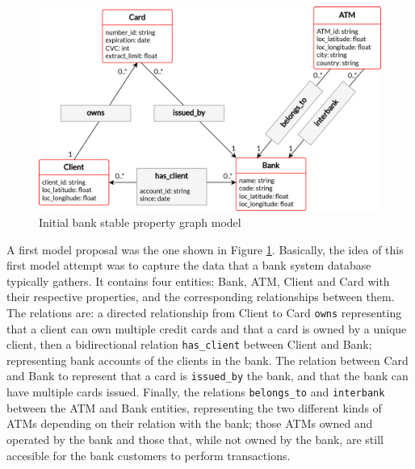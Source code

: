 \documentclass{article}
\begin{document}
\begin{figure}[H]
    \centering
    \includegraphics[scale = 0.7]{images/PG-stable-edit-cardinal.png}
    \caption{Initial bank stable property graph model}
    \label{img:initial-pg-stable}
\end{figure}

A first model proposal was the one shown in Figure \ref{img:initial-pg-stable}.
Basically, the idea of this first model attempt was to capture the data that a bank system database typically gathers.
It contains four entities: Bank, ATM, Client and Card with their respective properties, and the corresponding relationships between them.
The relations are: a directed relationship from Client to Card \texttt{owns} representing that a client can own multiple credit cards and that a card is owned by a unique client, then a bidirectional relation \texttt{has\_client} between Client and Bank; representing bank accounts of the clients in the bank. The relation between Card and Bank to represent that a card is \texttt{issued\_by} the bank, and that the bank can have multiple cards issued. Finally, the relations \texttt{belongs\_to} and \texttt{interbank} between the ATM and Bank entities, representing the two different kinds of ATMs depending on their relation with the bank; those ATMs owned and operated by the bank and those that, while not owned by the bank, are still accesible for the bank customers to perform transactions.
\end{document}

